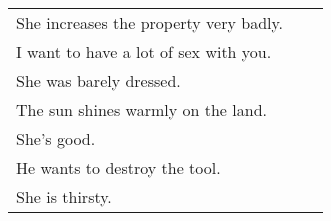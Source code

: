 \begin{supertabular}{p{5,5cm}|ll}
    She increases the property very badly. &  & \\ %
    I want to have a lot of sex with you.  &  & \\ %
    She was barely dressed.                &  & \\ %
    The sun shines warmly on the land.     &  & \\ %
    She's good.                            &  & \\ %
    He wants to destroy the tool.          &  & \\ %
    She is thirsty.                        &  & \\ %
\end{supertabular}

